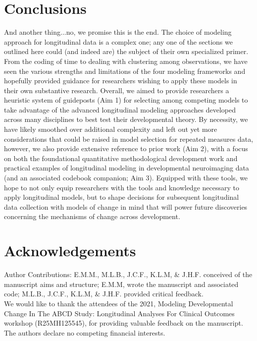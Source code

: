 \documentclass[11pt]{article}
\begin{document}
\section{Conclusions}
And another thing...no, we promise this is the end. The choice of modeling approach for longitudinal data is a complex one; any one of the sections we outlined here could (and indeed are) the subject of their own specialized primer. From the coding of time to dealing with clustering among observations, we have seen the various strengths and limitations of the four modeling frameworks and hopefully provided guidance for researchers wishing to apply these models in their own substantive research. Overall, we aimed to provide researchers a heuristic system of guideposts (Aim 1) for selecting among competing models to take advantage of the advanced longitudinal modeling approaches developed across many disciplines to best test their developmental theory. By necessity, we have likely smoothed over additional complexity and left out yet more considerations that could be raised in model selection for repeated measures data, however, we also provide extensive reference to prior work (Aim 2), with a focus on both the foundational quantitative methodological development work and practical examples of longitudinal modeling in developmental neuroimaging data (and an associated codebook companion; Aim 3). Equipped with these tools, we hope to not only equip researchers with the tools and knowledge necessary to apply longitudinal models, but to shape decisions for subsequent longitudinal data collection with models of change in mind that will power future discoveries concerning the mechanisms of change across development.

\newpage
\section*{Acknowledgements}
Author Contributions: E.M.M., M.L.B., J.C.F., K.L.M, \& J.H.F. conceived of the manuscript aims and structure; E.M.M, wrote the manuscript and associated code; M.L.B., J.C.F., K.L.M, \& J.H.F. provided critical feedback. \\

\noindent We would like to thank the attendees of the 2021, Modeling Developmental Change In The ABCD Study: Longitudinal Analyses For Clinical Outcomes workshop (R25MH125545), for providing valuable feedback on the manuscript. \\

\noindent The authors declare no competing financial interests.


\newpage
\singlespacing
\printbibliography
\end{document}
